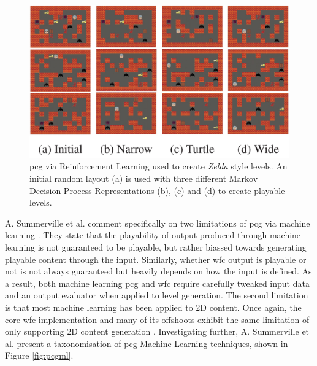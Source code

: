 \begin{figure}[H]
    \centering
    \includegraphics[width=\textwidth, height=0.3\textheight, keepaspectratio]{Images/PCGRL.jpg}
    \caption{\acrlong{pcg} via Reinforcement Learning used to create \textit{Zelda} style levels. An initial random layout (a) is used with three different Markov Decision Process Representations (b), (c) and (d) to create playable levels. \cite{Markov_PCGRL}}
    \label{fig:pcgrl}
\end{figure}

A. Summerville et al. comment specifically on two limitations of \acrshort{pcg} via machine learning \cite{PCGML}. They state that the playability of output produced through machine learning is not guaranteed to be playable, but rather biassed towards generating playable content through the input. Similarly, whether \acrshort{wfc} output is playable or not is not always guaranteed but heavily depends on how the input is defined. As a result, both machine learning \acrshort{pcg} and \acrshort{wfc} require carefully tweaked input data and an output evaluator when applied to level generation. The second limitation is that most machine learning has been applied to 2D content. Once again, the core \acrshort{wfc} implementation and many of its offshoots exhibit the same limitation of only supporting 2D content generation \cite{Gumin_Wave_Function_Collapse_2016}. Investigating further, A. Summerville et al. present a taxonomisation of \acrlong{pcg} Machine Learning techniques, shown in Figure \ref{fig:pcgml}.

